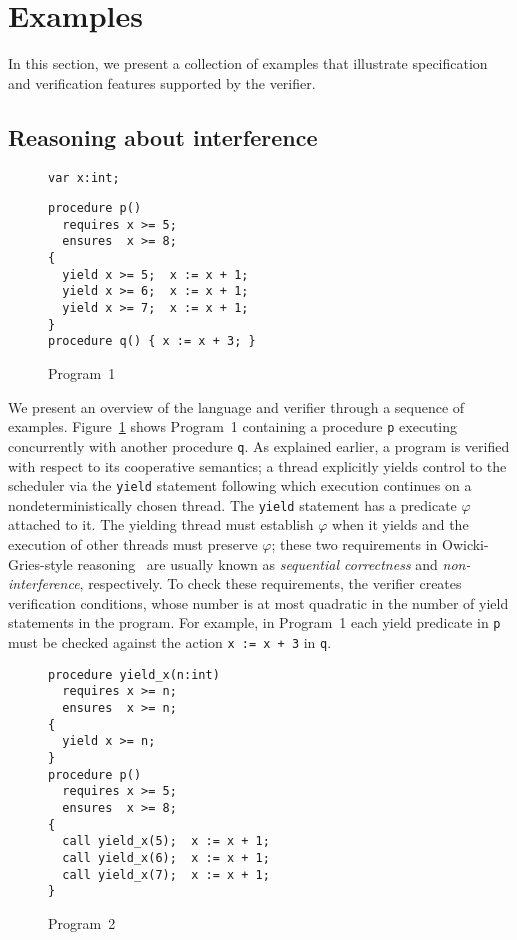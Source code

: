 \section{Examples}
\label{sec:examples}

In this section, we present a collection of examples that illustrate
specification and verification features supported by the \civl verifier.
\subsection{Reasoning about interference}
\label{sec:examples-interference}
\begin{figure}
\begin{verbatim}
var x:int;
\end{verbatim}
\begin{verbatim}
procedure p()
  requires x >= 5;
  ensures  x >= 8;
{
  yield x >= 5;  x := x + 1;
  yield x >= 6;  x := x + 1;
  yield x >= 7;  x := x + 1;
}
procedure q() { x := x + 3; }
\end{verbatim}
\caption{Program~1}
\label{fig:ex1}
\end{figure}

We present an overview of the \civl language and verifier through a sequence of examples.
Figure~\ref{fig:ex1} shows Program~1 containing a procedure {\tt p}
executing concurrently with another procedure {\tt q}. 
As explained earlier, a \civl program is verified with respect to its cooperative semantics; a thread explicitly yields control to the
scheduler via the {\tt yield} statement following which execution continues on a 
nondeterministically chosen thread.
The {\tt yield} statement has a predicate $\varphi$ attached to it.
The yielding thread must establish $\varphi$ when it yields and the execution of other threads 
must preserve $\varphi$; these two requirements in Owicki-Gries-style
reasoning~\cite{OwickiG76} are usually known as {\em sequential correctness}
and {\em non-interference}, respectively.
To check these requirements, the \civl verifier creates verification conditions, whose number is at most
quadratic in the number of yield statements in the program.
For example, in Program~1 each yield predicate in {\tt p} must be checked against the action 
{\tt x := x + 3} in {\tt q}.

\begin{figure}
\begin{verbatim}
procedure yield_x(n:int)
  requires x >= n;
  ensures  x >= n;
{
  yield x >= n;
}
procedure p()
  requires x >= 5;
  ensures  x >= 8;
{
  call yield_x(5);  x := x + 1;
  call yield_x(6);  x := x + 1;
  call yield_x(7);  x := x + 1;
}
\end{verbatim}
\caption{Program~2}
\label{fig:ex2}
\end{figure}

